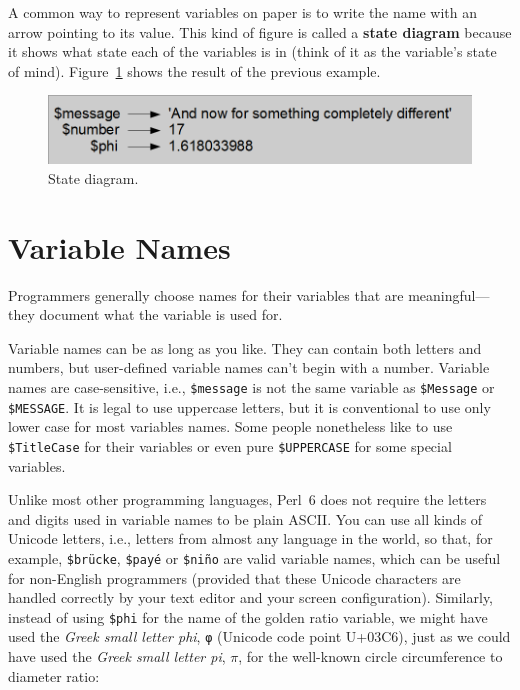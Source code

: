 A common way to represent variables on paper is to write the name with
an arrow pointing to its value.  This kind of figure is
called a {\bf state diagram} because it shows what state each of the
variables is in (think of it as the variable's state of mind).
Figure~\ref{fig.state2} shows the result of the previous example.

\begin{figure}
\centerline
{\includegraphics[scale=0.6]{figs/test_5.png}}
\caption{State diagram.}
\label{fig.state2}
\end{figure}



\section{Variable Names}

Programmers generally choose names for their variables that
are meaningful---they document what the variable is used for.

Variable names can be as long as you like.  They can contain
both letters and numbers, but user-defined variable names 
can't begin with a number. Variable names are case-sensitive, 
i.e., {\tt \$message} is not the same variable as {\tt \$Message} 
or {\tt \$MESSAGE}. It is legal to use uppercase letters, but 
it is conventional to use only lower case for most variables 
names. Some people nonetheless like to use {\tt \$TitleCase} 
for their variables or even pure {\tt \$UPPERCASE} for 
some special variables.


Unlike most other programming languages, Perl~6 does not require 
the letters and digits used in variable names to be plain ASCII. 
You can use all kinds of Unicode letters, i.e., 
letters from almost any language in the world, so that, for example,  
{\tt \$brücke}, {\tt \$payé} or {\tt \$niño} are 
valid variable names, which can be useful for non-English 
programmers (provided that these Unicode characters are 
handled correctly by your text editor and your 
screen configuration). Similarly, instead of using 
\verb"$phi" for the name of the golden ratio variable, 
we might have used the \emph{Greek small letter phi}, \verb'φ' 
(Unicode code point U+03C6), just as we could have used 
the \emph{Greek small letter pi}, $\pi$,  for the well-known 
circle circumference to diameter ratio:

